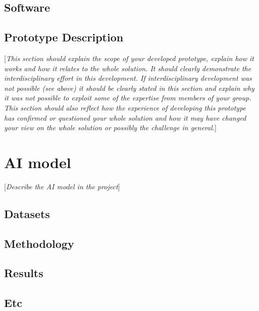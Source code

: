 \documentclass[10pt,english, openany]{book}
\begin{document}


\section{Software}
\section{Prototype Description}
[\textit{This section should explain the scope of your developed prototype, explain how it works and how it relates to the whole solution. It should clearly demonstrate the interdisciplinary effort in this development. If interdisciplinary development was not possible (see above) it should be clearly stated in this section and explain why it was not possible to exploit some of the expertise from members of your group. This section should also reflect how the experience of developing this prototype has confirmed or questioned your whole solution and how it may have changed your view on the whole solution or possibly the challenge in general.}]

\chapter{AI model}\label{chapt:model}
[\textit{Describe the AI model in the project}]
\section{Datasets}
\section{Methodology}
\section{Results}
\section{Etc}
\end{document}
